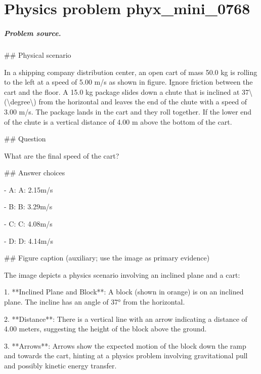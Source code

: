 
\chapter{Physics problem phyx\_mini\_0768}
\label{ch:PhyXMiniProblems_problem_phyx_mini_0768}

\paragraph{Problem source.}
\#\# Physical scenario

In a shipping company distribution center, an open cart of mass 50.0 kg is rolling to the left at a speed of 5.00 m/s as shown in figure. Ignore friction between the cart and the floor. A 15.0 kg package slides down a chute that is inclined at 37\textbackslash{}(\textbackslash{}degree\textbackslash{}) from the horizontal and leaves the end of the chute with a speed of 3.00 m/s. The package lands in the cart and they roll together. If the lower end of the chute is a vertical distance of 4.00 m above the bottom of the cart.

\#\# Question

What are the final speed of the cart?

\#\# Answer choices

- A: A: 2.15m/s

- B: B: 3.29m/s

- C: C: 4.08m/s

- D: D: 4.14m/s

\#\# Figure caption (auxiliary; use the image as primary evidence)

The image depicts a physics scenario involving an inclined plane and a cart:

1. **Inclined Plane and Block**: A block (shown in orange) is on an inclined plane. The incline has an angle of 37° from the horizontal.

2. **Distance**: There is a vertical line with an arrow indicating a distance of 4.00 meters, suggesting the height of the block above the ground.

3. **Arrows**: Arrows show the expected motion of the block down the ramp and towards the cart, hinting at a physics problem involving gravitational pull and possibly kinetic energy transfer.

